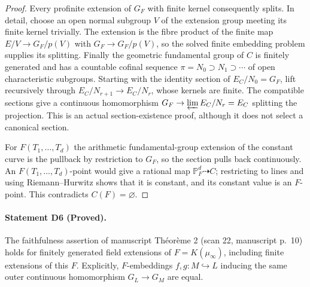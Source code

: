 \begin{proof}
Every profinite extension of $G_F$ with finite kernel consequently
splits.  In detail, choose an open normal subgroup $V$ of the extension
group meeting its finite kernel trivially.  The extension is the fibre
product of the finite map $E/V\to G_F/p(V)$ with
$G_F\to G_F/p(V)$, so the solved finite embedding problem supplies its
splitting.  Finally the geometric fundamental group of $C$ is finitely
generated and has a countable cofinal sequence
$\pi=N_0\supset N_1\supset\cdots$ of open characteristic subgroups.
Starting with the identity section of $E_C/N_0=G_F$, lift recursively
through $E_C/N_{r+1}\to E_C/N_r$, whose kernels are finite.
The compatible sections give a continuous homomorphism
$G_F\to\varprojlim E_C/N_r=E_C$ splitting the projection.  This is an
actual section-existence proof, although it does not select a canonical
section.

For $F(T_1,\ldots,T_d)$ the arithmetic fundamental-group extension of
the constant curve is the pullback by restriction to $G_F$, so the
section pulls back continuously.  An $F(T_1,\ldots,T_d)$-point would
give a rational map $\mathbb P^d_F\dashrightarrow C$; restricting to
lines and using Riemann--Hurwitz shows that it is constant, and its
constant value is an $F$-point.  This contradicts $C(F)=\varnothing$.
\end{proof}

\paragraph{Statement D6 (Proved).}\label{res:D6}
The faithfulness assertion of manuscript Th\'eor\`eme 2 (scan 22,
manuscript p.~10) holds for finitely generated field extensions of
$F=K(\mu_\infty)$, including finite extensions of this $F$.
Explicitly, $F$-embeddings $f,g:M\hookrightarrow L$ inducing the same
outer continuous homomorphism $G_L\to G_M$ are equal.

